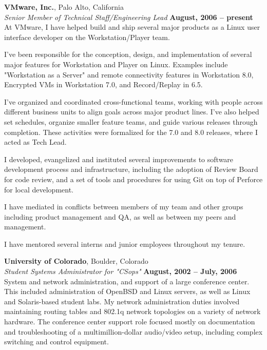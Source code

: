 \documentclass[margin,line]{resume}
\begin{document}
\begin{resume}
    {\bf VMware, Inc.}, Palo Alto, California \vspace{2mm}\\\vspace{1mm}%
    {\sl Senior Member of Technical Staff/Engineering Lead} \hfill {\bf August, 2006 -- present}\\
    At VMware, I have helped build and ship several major products as a Linux
    user interface developer on the Workstation/Player team.
    \begin{list1}
    \item I've been responsible for the conception, design, and implementation
          of several major features for Workstation and Player on Linux.
          Examples include "Workstation as a Server" and remote connectivity
          features in Workstation 8.0, Encrypted VMs in Workstation 7.0, and
          Record/Replay in 6.5.
    \item I've organized and coordinated cross-functional teams, working with
          people across different business units to align goals across major
          product lines. I've also helped set schedules, organize smaller
          feature teams, and guide various releases through completion. These
          activities were formalized for the 7.0 and 8.0 releases, where I acted
          as Tech Lead.
    \item I developed, evangelized and instituted several improvements to
          software development process and infrastructure, including the
          adoption of Review Board for code review, and a set of tools and
          procedures for using Git on top of Perforce for local development.
    \item I have mediated in conflicts between members of my team and other
          groups including product management and QA, as well as between my
          peers and management.
    \item I have mentored several interns and junior employees throughout my
          tenure.
    \end{list1}

    \ifcv
        \newpage
        {\bf University of Colorado}, Boulder, Colorado \vspace{2mm}\\\vspace{1mm}%
        {\sl Student Systems Administrator for "CSops"} \hfill {\bf August, 2002 -- July, 2006}\\
        System and network administration, and support of a large conference
        center. This included administration of OpenBSD and Linux servers, as well
        as Linux and Solaris-based student labs. My network administration duties
        involved maintaining routing tables and 802.1q network topologies on a
        variety of network hardware. The conference center support role focused
        mostly on documentation and troubleshooting of a multimillion-dollar
        audio/video setup, including complex switching and control equipment.


\end{resume}
\end{document}
